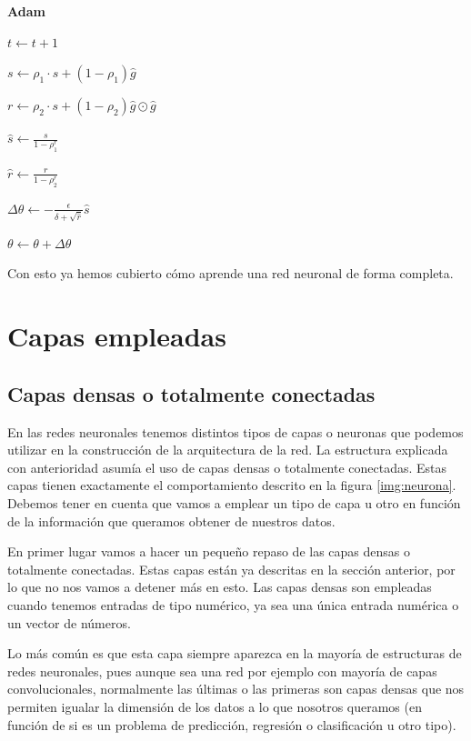 \begin{itemize}
\begin{algorithm}[]{\Large{\textbf{Adam}}}
{			$t\leftarrow t+1$
			
			$s\leftarrow \rho_1 \cdot s + (1-\rho_1)\hat{g}$
			
			$r\leftarrow \rho_2 \cdot s + (1-\rho_2)\hat{g}\odot \hat{g}$
			
			$\hat{s}\leftarrow \frac{s}{1-\rho_1^r}$
			
			$\hat{r}\leftarrow \frac{r}{1-\rho_2^r}$
			
			$\Delta \theta \leftarrow - \frac{\epsilon}{\delta + \sqrt{\hat{r}}}\hat{s}$
			
			$\theta \leftarrow \theta + \Delta \theta$
			
		}
		
		\vspace{10px}
		
		
		\vspace{5px}
	\end{algorithm}
\end{itemize}

Con esto ya hemos cubierto cómo aprende una red neuronal de forma completa.
\newpage

\section{Capas empleadas}

\subsection{Capas densas o totalmente conectadas}

En las redes neuronales tenemos distintos tipos de capas o neuronas que podemos utilizar en la construcción de la arquitectura de la red. La estructura explicada con anterioridad asumía el uso de capas densas o totalmente conectadas. Estas capas tienen exactamente el comportamiento descrito en la figura \ref{img:neurona}. Debemos tener en cuenta que vamos a emplear un tipo de capa u otro en función de la información que queramos obtener de nuestros datos.

En primer lugar vamos a hacer un pequeño repaso de las capas densas o totalmente conectadas. Estas capas están ya descritas en la sección anterior, por lo que no nos vamos a detener más en esto. Las capas densas son empleadas cuando tenemos entradas de tipo numérico, ya sea una única entrada numérica o un vector de números. 

Lo más común es que esta capa siempre aparezca en la mayoría de estructuras de redes neuronales, pues aunque sea una red por ejemplo con mayoría de capas convolucionales, normalmente las últimas o las primeras son capas densas que nos permiten igualar la dimensión de los datos a lo que nosotros queramos (en función de si es un problema de predicción, regresión o clasificación u otro tipo).

